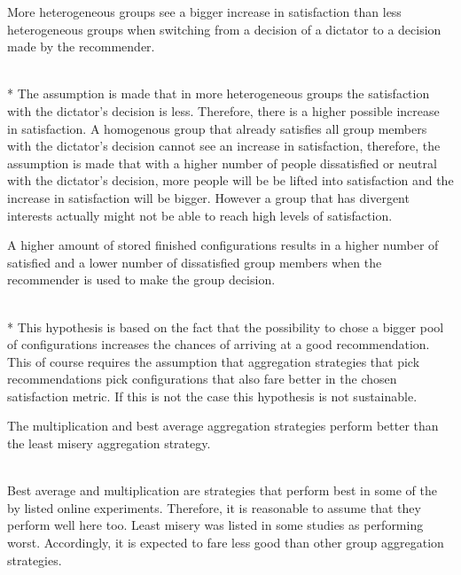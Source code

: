 \begin{hypothesis}
    \begin{itshape}
        \label{hyp:Evaluation:HeterogenousBiggerSatisfactionIncrease} More heterogeneous groups see a bigger increase in satisfaction than less heterogeneous groups when switching from a decision of a dictator to a decision made by the recommender.
    \end{itshape} \medskip \\*
    The assumption is made that in more heterogeneous groups the satisfaction with the dictator's decision is less. Therefore, there is a higher possible increase in satisfaction. A homogenous group that already satisfies all group members with the dictator's decision cannot see an increase in satisfaction, therefore, the assumption is made that with a higher number of people dissatisfied or neutral with the dictator's decision, more people will be be lifted into satisfaction and the increase in satisfaction will be bigger. However a group that has divergent interests actually might not be able to reach high levels of satisfaction.
\end{hypothesis}

\begin{hypothesis}
    \begin{itshape}
        \label{hyp:Evaluation:StoreSizeBetterResults} A higher amount of stored finished configurations results in a higher number of satisfied and a lower number of dissatisfied group members when the recommender is used to make the group decision.
    \end{itshape} \medskip \\*
    This hypothesis is based on the fact that the possibility to chose a bigger pool of configurations increases the chances of arriving at a good recommendation. This of course requires the assumption that aggregation strategies that pick recommendations pick configurations that also fare better in the chosen satisfaction metric. If this is not the case this hypothesis is not sustainable.
\end{hypothesis}

\begin{hypothesis}
    \begin{itshape}
        \label{hyp:Evaluation:AggregationStrategies} The multiplication and best average aggregation strategies perform better than the least misery aggregation strategy.
    \end{itshape} \medskip \\
    Best average and multiplication are strategies that perform best in some of the by \citeauthor{Masthoff2015} \cite[~ 755f]{Masthoff2015} listed online experiments. Therefore, it is reasonable to assume that they perform well here too. Least misery was listed in some studies as performing worst. Accordingly, it is expected to fare less good than other group aggregation strategies.
\end{hypothesis}

